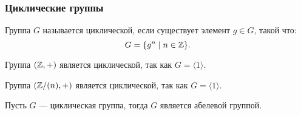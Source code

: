 \subsubsection{Циклические группы}
\begin{definition}
    Группа $G$ называется циклической, если существует элемент $g \in G$, такой что:
    \[
        G = \{g^n \mid n \in \mathbb Z\}.
    \]
\end{definition}
\begin{example}
    Группа $(\mathbb Z, +)$ является циклической, так как $G = \langle 1 \rangle$.
\end{example}
\begin{example}
    Группа $(\mathbb Z/{(n)}, +)$ является циклической, так как $G = \langle 1 \rangle$.
\end{example}
\begin{lemma}
    Пусть $G$ --- циклическая группа, тогда $G$ является абелевой группой.
\end{lemma}
